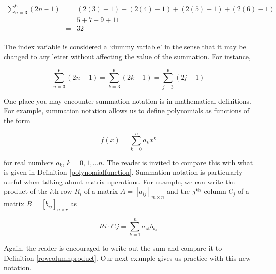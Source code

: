 \documentclass{ximera}
\begin{document}
\[ \begin{array}{rcl}

\displaystyle{\sum_{n=3}^{6}(2n-1) } & = & (2(3)-1) + (2(4)-1) + (2(5)-1) +  (2(6)-1) \\
                     & = &  5 + 7 + 9 + 11 \\
                     & = & 32 \\
\end{array} \]

The index variable  is considered a `dummy variable' in the sense that it may be changed to any letter without affecting the value of the summation.  For instance, 

\[ \displaystyle{\sum_{n=3}^{6}(2n-1)} = \displaystyle{\sum_{k=3}^{6}(2k-1)} = \displaystyle{\sum_{j=3}^{6}(2j-1)}\]

One place you may encounter summation notation is in mathematical definitions.  For example, summation notation allows us to define polynomials as functions of the form

\[ f(x) = \displaystyle{\sum_{k=0}^{n} a_{k} x^{k}} \]

for real numbers $a_{k}$, $k = 0, 1, \ldots n$.  The reader is invited to compare this with what is given in Definition \ref{polynomialfunction}.  Summation notation is particularly useful when talking about matrix operations.  For example, we can write the product of the $i$th row $R_{i}$ of a matrix $A = [a_{ij}]_{m \times n}$ and the $j^{\mbox{\scriptsize th}}$ column $C_{j}$ of a matrix $B = [b_{ij}]_{n \times r}$ as

\[ Ri \cdot Cj = \displaystyle{\sum_{k=1}^{n} a_{ik}b_{kj}} \]

Again, the reader is encouraged to write out the sum and compare it to Definition \ref{rowcolumnproduct}.  Our next example gives us practice with this new notation. 
\end{document}

